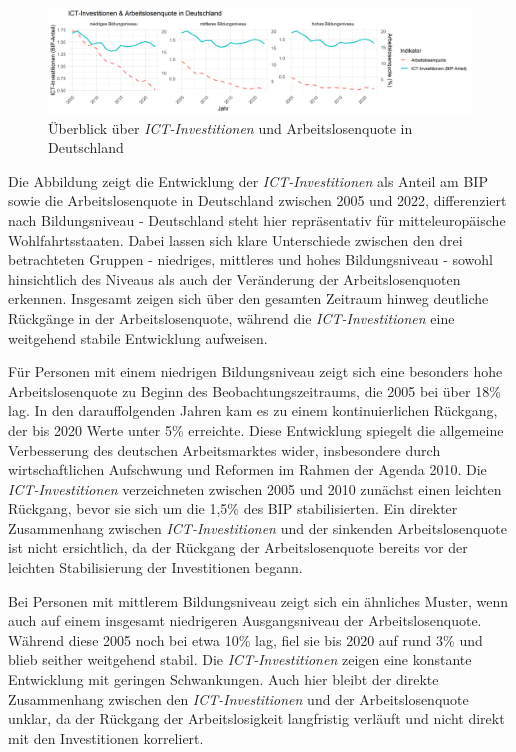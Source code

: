 \begin{figure}[htbp]
    \centering
    \includegraphics[width=\textwidth]{assets/plot_germany_final.png}
    \caption{Überblick über \textit{\ac{ICT}-Investitionen} und Arbeitslosenquote in 
    Deutschland}
    \label{fig:germany}
\end{figure}

Die Abbildung zeigt die Entwicklung der \textit{\ac{ICT}-Investitionen} als Anteil 
am BIP sowie die Arbeitslosenquote in Deutschland zwischen 2005 und 2022, 
differenziert nach Bildungsniveau - Deutschland steht hier repräsentativ für 
mitteleuropäische Wohlfahrtsstaaten. Dabei lassen sich klare Unterschiede zwischen 
den drei betrachteten Gruppen - niedriges, mittleres und hohes Bildungsniveau - sowohl 
hinsichtlich des Niveaus als auch der Veränderung der Arbeitslosenquoten erkennen. 
Insgesamt zeigen sich über den gesamten Zeitraum hinweg deutliche Rückgänge in der 
Arbeitslosenquote, während die \textit{\ac{ICT}-Investitionen} eine weitgehend 
stabile Entwicklung aufweisen.

Für Personen mit einem niedrigen Bildungsniveau zeigt sich eine besonders hohe 
Arbeitslosenquote zu Beginn des Beobachtungszeitraums, die 2005 bei über 18\% lag. 
In den darauffolgenden Jahren kam es zu einem kontinuierlichen Rückgang, der bis 2020 
Werte unter 5\% erreichte. Diese Entwicklung spiegelt die allgemeine Verbesserung des 
deutschen Arbeitsmarktes wider, insbesondere durch wirtschaftlichen Aufschwung und 
Reformen im Rahmen der Agenda 2010. Die \textit{\ac{ICT}-Investitionen} verzeichneten 
zwischen 2005 und 2010 zunächst einen leichten Rückgang, bevor sie sich um die 1,5\% 
des BIP stabilisierten. Ein direkter Zusammenhang zwischen 
\textit{\ac{ICT}-Investitionen} und der sinkenden Arbeitslosenquote ist nicht 
ersichtlich, da der Rückgang der Arbeitslosenquote bereits vor der leichten 
Stabilisierung der Investitionen begann.

Bei Personen mit mittlerem Bildungsniveau zeigt sich ein ähnliches Muster, wenn auch 
auf einem insgesamt niedrigeren Ausgangsniveau der Arbeitslosenquote. Während diese 
2005 noch bei etwa 10\% lag, fiel sie bis 2020 auf rund 3\% und blieb seither 
weitgehend stabil. Die \textit{\ac{ICT}-Investitionen} zeigen eine konstante 
Entwicklung mit geringen Schwankungen. Auch hier bleibt der direkte Zusammenhang 
zwischen den \textit{\ac{ICT}-Investitionen} und der Arbeitslosenquote unklar, da 
der Rückgang der Arbeitslosigkeit langfristig verläuft und nicht direkt mit den 
Investitionen korreliert.

